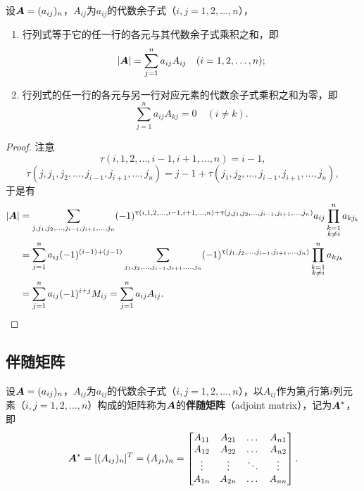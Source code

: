 \begin{theorem}
设\(\boldsymbol{A}=(a_{ij})_n\)，\(A_{ij}\)为\(a_{ij}\)的代数余子式（\(i,j=1,2,\dotsc,n\)），%
\begin{enumerate}
\item 行列式等于它的任一行的各元与其代数余子式乘积之和，即\[
\abs{\boldsymbol{A}}=\sum\limits_{j=1}^n a_{ij} A_{ij}
\quad(i=1,2,\dotsc,n);
\]

\item 行列式的任一行的各元与另一行对应元素的代数余子式乘积之和为零，即\[
\sum\limits_{j=1}^n a_{ij} A_{kj} = 0 \quad (i \neq k).
\]
\end{enumerate}
\begin{proof}
注意\[
\tau(i,1,2,\dotsc,i-1,i+1,\dotsc,n) = i-1,
\]\[
\tau(j,j_1,j_2,\dotsc,j_{i-1},j_{i+1},\dotsc,j_n) = j-1+\tau(j_1,j_2,\dotsc,j_{i-1},j_{i+1},\dotsc,j_n),
\]于是有\begin{align*}
\abs{\boldsymbol{A}}
&= \sum\limits_{j,j_1,j_2,\dotsc,j_{i-1},j_{i+1},\dotsc,j_n}
	(-1)^{\uptau(i,1,2,\dotsc,i-1,i+1,\dotsc,n) + \uptau(j,j_1,j_2,\dotsc,j_{i-1},j_{i+1},\dotsc,j_n)} a_{ij} \prod\limits_{\substack{k=1 \\ k \neq i}}^n a_{k j_k} \\
&= \sum\limits_{j=1}^n a_{ij} (-1)^{(i-1)+(j-1)}
	\sum\limits_{j_1,j_2,\dotsc,j_{i-1},j_{i+1},\dotsc,j_n}
		(-1)^{\uptau(j_1,j_2,\dotsc,j_{i-1},j_{i+1},\dotsc,j_n)}
			\prod\limits_{\substack{k=1 \\ k \neq i}}^n a_{k j_k} \\
&= \sum\limits_{j=1}^n a_{ij} (-1)^{i+j} M_{ij}
= \sum\limits_{j=1}^n a_{ij} A_{ij}.
\qedhere
\end{align*}
\end{proof}
\end{theorem}

\subsection{伴随矩阵}
\begin{definition}
设\(\boldsymbol{A}=(a_{ij})_n\)，\(A_{ij}\)为\(a_{ij}\)的代数余子式（\(i,j=1,2,\dotsc,n\)），以\(A_{ij}\)作为第\(j\)行第\(i\)列元素（\(i,j=1,2,\dotsc,n\)）构成的矩阵称为\(\boldsymbol{A}\)的\textbf{伴随矩阵}（adjoint matrix），记为\(\boldsymbol{A}^*\)，即\[
\boldsymbol{A}^*
= [(A_{ij})_n]^T
= (A_{ji})_n
= \begin{bmatrix}
A_{11} & A_{21} & \dots & A_{n1} \\
A_{12} & A_{22} & \dots & A_{n2} \\
\vdots & \vdots & \ddots & \vdots \\
A_{1n} & A_{2n} & \dots & A_{nn}
\end{bmatrix}.
\]
\end{definition}


